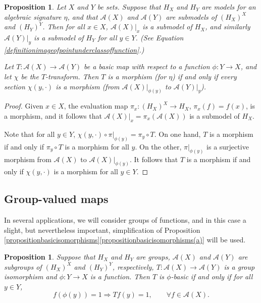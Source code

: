 \documentclass[letter,11pt]{amsart}
\theoremstyle{plain}		\newtheorem{theorem}[generalnumbering]{Theorem}
\theoremstyle{plain}		\newtheorem{corollary}[generalnumbering]{Corollary}
\theoremstyle{definition}		\newtheorem{definition}[generalnumbering]{Definition}
\theoremstyle{definition}		\newtheorem{example}[generalnumbering]{Example}
\theoremstyle{plain}		\newtheorem{proposition}[generalnumbering]{Proposition}
\theoremstyle{plain}		\newtheorem{lemma}[generalnumbering]{Lemma}
\theoremstyle{definition}
\begin{document}
\begin{proposition}\label{propositionmodelmorphism}
	Let $X$ and $Y$ be sets. Suppose that $H_X$ and $H_Y$ are models for an algebraic signature $\eta$, and that $\mathcal{A}(X)$ and $\mathcal{A}(Y)$ are submodels of $(H_X)^X$ and $(H_Y)^Y$. Then for all $x\in X$, $\mathcal{A}(X)|_x$ is a submodel of $H_X$, and similarly $\mathcal{A}(Y)|_y$ is a submodel of $H_Y$ for all $y\in Y$. (See Equation \eqref{definitionimageofpointunderclassoffunction}.)
	
	Let $T\colon\mathcal{A}(X)\to\mathcal{A}(Y)$ be a basic map with respect to a function $\phi\colon Y\to X$, and let $\chi$ be the $T$-transform. Then $T$ is a morphism (for $\eta$) if and only if every section $\chi(y,\cdot)$ is a morphism (from $\mathcal{A}(X)|_{\phi(y)}$ to $\mathcal{A}(Y)|_y$).
\end{proposition}
\begin{proof}
	Given $x\in X$, the evaluation map $\pi_x\colon(H_X)^X\to H_X$, $\pi_x(f)=f(x)$, is a morphism, and it follows that $\mathcal{A}(X)|_x=\pi_x(\mathcal{A}(X))$ is a submodel of $H_X$.
	
	Note that for all $y\in Y$, $\chi(y,\cdot)\circ\pi|_{\phi(y)}=\pi_y\circ T$. On one hand, $T$ is a morphism if and only if $\pi_y\circ T$ is a morphism for all $y$. On the other, $\pi|_{\phi(y)}$ is a surjective morphism from $\mathcal{A}(X)$ to $\mathcal{A}(X)|_{\phi(y)}$. It follows that $T$ is a morphism if and only if $\chi(y,\cdot)$ is a morphism for all $y\in Y$.\qedhere
\end{proof}

\subsection{Group-valued maps}\label{subsectiongroupvaluedmaps}

In several applications, we will consider groups of functions, and in this case a slight, but nevertheless important, simplification of Proposition \ref{propositionbasicisomorphisms}\ref{propositionbasicisomorphisms(a)} will be used.

\begin{proposition}\label{propositionbasicnessofgroupvalued}
	Suppose that $H_X$ and $H_Y$ are groups, $\mathcal{A}(X)$ and $\mathcal{A}(Y)$ are subgroups of $(H_X)^X$ and $(H_Y)^Y$, respectively, $T\colon\mathcal{A}(X)\to\mathcal{A}(Y)$ is a group isomorphism and $\phi\colon Y\to X$ is a function. Then $T$ is $\phi$-basic if and only if for all $y\in Y$,
	\[f(\phi(y))=1\Longrightarrow Tf(y)=1,\qquad\forall f\in\mathcal{A}(X).\]
\end{proposition}
\end{document}
